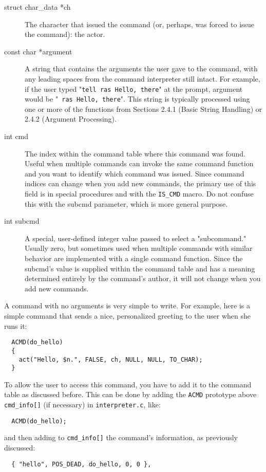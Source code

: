 \documentclass[11pt]{article}
\begin{document}
\begin{description}
\item[struct char\_data *ch]
The character that issued the command (or, perhaps, was forced to issue the command): the actor.
\item[const char *argument]
A string that contains the arguments the user gave to the command, with any leading spaces from the command interpreter still intact. For example, if the user typed "\texttt{tell ras Hello, there}" at the prompt, argument would be "\texttt{ ras Hello, there}".  This string is typically processed using one or more of the functions from Sections 2.4.1 (Basic String Handling) or 2.4.2 (Argument Processing).
\item[int cmd]
The index within the command table where this command was found. Useful when multiple commands can invoke the same command function and you want to identify which command was issued.  Since command indices can change when you add new commands, the primary use of this field is in special procedures and with the \texttt{IS\_CMD} macro.  Do not confuse this with the subcmd parameter, which is more general purpose.
\item[int subcmd]
A special, user-defined integer value passed to select a "subcommand." Usually zero, but sometimes used when multiple commands with similar behavior are implemented with a single command function.  Since the subcmd's value is supplied within the command table and has a meaning determined entirely by the command's author, it will not change when you add new commands.
\end{description}
A command with no arguments is very simple to write.  For example, here is a simple command that sends a nice, personalized greeting to the user when she runs it:
\begin{verbatim}
  ACMD(do_hello)
  {
    act("Hello, $n.", FALSE, ch, NULL, NULL, TO_CHAR);
  }
\end{verbatim}
To allow the user to access this command, you have to add it to the command table as discussed before.  This can be done by adding the \texttt{ACMD} prototype above \texttt{cmd\_info[]} (if necessary) in \texttt{interpreter.c}, like:
\begin{verbatim}
  ACMD(do_hello);
\end{verbatim}
and then adding to \texttt{cmd\_info[]} the command's information, as previously discussed:
\begin{verbatim}
  { "hello", POS_DEAD, do_hello, 0, 0 },
\end{verbatim}
\end{document}
